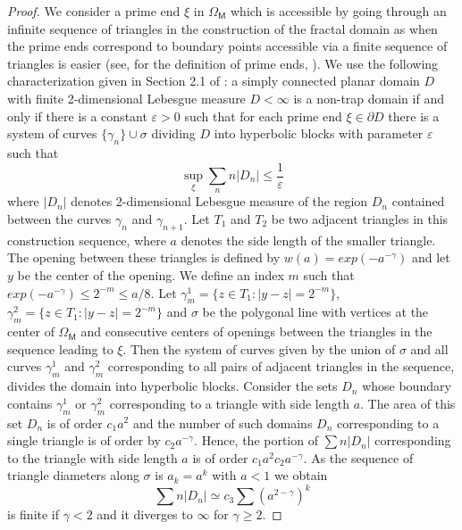 \documentclass[[11pt,a4paper,reqno]{article}
\numberwithin{equation}{section}
\begin{document}
\begin{proof}


 We consider a prime end $\xi$ in $\Omega_\mathsf{M}$ which is accessible  by going through an infinite sequence of  triangles  in the construction of the fractal domain as when  the prime ends correspond to boundary points accessible via a finite sequence of triangles  is easier  (see, for the definition of prime ends,  \cite{P}).
  We use the following  characterization given in Section 2.1  of \cite{BCM}: a simply connected  planar domain $D$   with finite 2-dimensional Lebesgue measure $D<\infty$  is a non-trap domain
if and only if there is a constant $\varepsilon  > 0$ such that for each prime end $\xi\in \partial D $ there is a
system of curves $\{\gamma_n\} \cup \sigma$ dividing $D$ into hyperbolic blocks with parameter $\varepsilon $  such that $$\sup_{\xi}\sum_{n} n|D_n|\leq \frac1{\varepsilon}$$
where $|D_n|$ denotes  2-dimensional Lebesgue measure of  the region $D_n$  contained between the curves $\gamma_n$ and $\gamma_{n+1}.$  
Let  $T_1$ and $T_2$   be two adjacent triangles  in this construction sequence, where $a$ denotes the side length of the smaller triangle.  The  opening between these triangles is defined by   $w(a)=exp(-a^{-\gamma})$ and 
  let $y$ be the center of  the opening. We define an index   $m$ such that  $exp(-a^{-\gamma} )\leq 2^{-m}\leq a/8.$ Let  $\gamma_m^1 =\{z\in T_1 :|y-z|=2^{-m}\},$  $\gamma_m^2 =\{z\in T_1 :|y-z|=2^{-m}\}$ and 
    $\sigma$ be the polygonal line with vertices at the center of $\Omega_\mathsf{M}$ and consecutive centers of openings between the triangles in the sequence leading to $\xi.$
   Then the system of curves given by the union of $\sigma$ and all curves $\gamma_m^1$  and $\gamma_m^2$
 corresponding to all pairs of adjacent triangles in the sequence, divides the domain into hyperbolic blocks. 
 Consider the sets $D_n$ whose boundary contains $\gamma_m^1$  or $\gamma_m^2$ corresponding to a triangle
with side length $a. $
The area of this set $D_n$ is of order  $c_1a^2$ and the number of such 
domains $D_n$ corresponding to a single triangle is of order by $c_2 a^{-\gamma}.$ Hence, the portion of   $\sum n| D_n|$ corresponding to the triangle with side length $a$ is of order  $c_1a^2c_2 a^{-\gamma}.$
As the sequence of triangle diameters  along $\sigma$ is     $a_k=a^k$  with $a<1$ we obtain   $$\sum n|D_n| \simeq  c_3  \sum  (a^{2-\gamma})^k $$ is finite if $\gamma < 2$ and it diverges to $\infty$  for $\gamma \geq 2. $

\end{proof}
\end{document}
